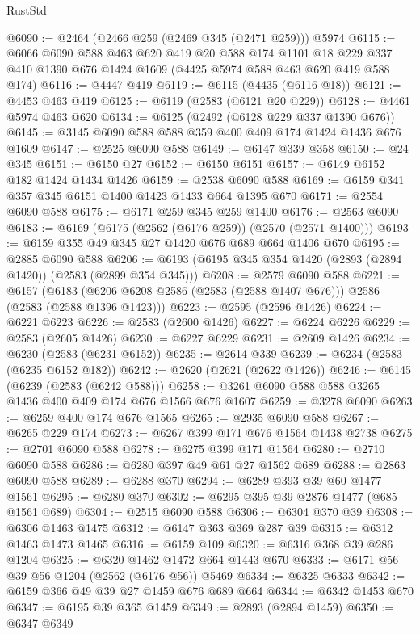 \begin{lexlean}{RustStd}
\begin{coremodule}
@6090 := @2464 (@2466 @259 (@2469 @345 (@2471 @259))) @5974
@6115 := @6066
    @6090
    @588
    @463
    @620
    @419
    @20
    @588
    @174
    @1101
    @18
    @229
    @337
    @410
    @1390
    @676
    @1424
    @1609
    (@4425 @5974 @588 @463 @620 @419 @588 @174)
@6116 := @4447 @419
@6119 := @6115 (@4435 (@6116 @18))
@6121 := @4453 @463 @419
@6125 := @6119 (@2583 (@6121 @20 @229))
@6128 := @4461 @5974 @463 @620
@6134 := @6125 (@2492 (@6128 @229 @337 @1390 @676))
@6145 := @3145 @6090 @588 @588 @359 @400 @409 @174 @1424 @1436 @676 @1609
@6147 := @2525 @6090 @588
@6149 := @6147 @339 @358
@6150 := @24 @345
@6151 := @6150 @27
@6152 := @6150 @6151
@6157 := @6149 @6152 @182 @1424 @1434 @1426
@6159 := @2538 @6090 @588
@6169 := @6159 @341 @357 @345 @6151 @1400 @1423 @1433 @664 @1395 @670
@6171 := @2554 @6090 @588
@6175 := @6171 @259 @345 @259 @1400
@6176 := @2563 @6090
@6183 := @6169 (@6175 (@2562 (@6176 @259)) (@2570 (@2571 @1400)))
@6193 := @6159 @355 @49 @345 @27 @1420 @676 @689 @664 @1406 @670
@6195 := @2885 @6090 @588
@6206 := @6193 (@6195 @345 @354 @1420 (@2893 (@2894 @1420)) (@2583 (@2899 @354 @345)))
@6208 := @2579 @6090 @588
@6221 := @6157
    (@6183 (@6206 @6208 @2586 (@2583 (@2588 @1407 @676))) @2586 (@2583 (@2588 @1396 @1423)))
@6223 := @2595 (@2596 @1426)
@6224 := @6221 @6223
@6226 := @2583 (@2600 @1426)
@6227 := @6224 @6226
@6229 := @2583 (@2605 @1426)
@6230 := @6227 @6229
@6231 := @2609 @1426
@6234 := @6230 (@2583 (@6231 @6152))
@6235 := @2614 @339
@6239 := @6234 (@2583 (@6235 @6152 @182))
@6242 := @2620 (@2621 (@2622 @1426))
@6246 := @6145 (@6239 (@2583 (@6242 @588)))
@6258 := @3261 @6090 @588 @588 @3265 @1436 @400 @409 @174 @676 @1566 @676 @1607
@6259 := @3278 @6090
@6263 := @6259 @400 @174 @676 @1565
@6265 := @2935 @6090 @588
@6267 := @6265 @229 @174
@6273 := @6267 @399 @171 @676 @1564 @1438 @2738
@6275 := @2701 @6090 @588
@6278 := @6275 @399 @171 @1564
@6280 := @2710 @6090 @588
@6286 := @6280 @397 @49 @61 @27 @1562 @689
@6288 := @2863 @6090 @588
@6289 := @6288 @370
@6294 := @6289 @393 @39 @60 @1477 @1561
@6295 := @6280 @370
@6302 := @6295 @395 @39 @2876 @1477 (@685 @1561 @689)
@6304 := @2515 @6090 @588
@6306 := @6304 @370 @39
@6308 := @6306 @1463 @1475
@6312 := @6147 @363 @369 @287 @39
@6315 := @6312 @1463 @1473 @1465
@6316 := @6159 @109
@6320 := @6316 @368 @39 @286 @1204
@6325 := @6320 @1462 @1472 @664 @1443 @670
@6333 := @6171 @56 @39 @56 @1204 (@2562 (@6176 @56)) @5469
@6334 := @6325 @6333
@6342 := @6159 @366 @49 @39 @27 @1459 @676 @689 @664
@6344 := @6342 @1453 @670
@6347 := @6195 @39 @365 @1459
@6349 := @2893 (@2894 @1459)
@6350 := @6347 @6349

\end{coremodule}
\end{lexlean}
